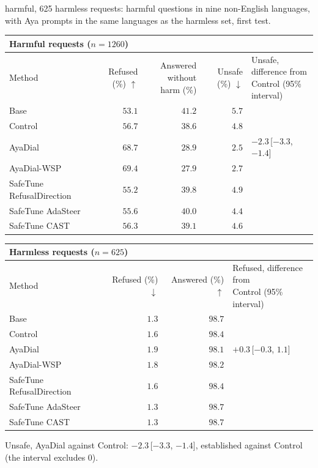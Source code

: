 \documentclass[10pt,a4paper]{article}
\renewcommand{\arraystretch}{1.12}
\begin{document}
\vspace{-3pt} harmful, 625 harmless requests: harmful questions in nine non-English languages, with Aya prompts in the same languages as the harmless set, first test.

\begin{table}[H]\centering\small\renewcommand{\arraystretch}{1.25}\begin{tabular}{|l|r|r|r|l|}\hline
\multicolumn{5}{|l|}{\textbf{Harmful requests ($n = 1260$)}}\\\hline
Method & Refused (\%) $\uparrow$ & \makecell[r]{Answered without\\harm (\%)} & Unsafe (\%) $\downarrow$ & \makecell[l]{Unsafe, difference from\\Control (95\% interval)}\\\hline
Base & $53.1$ & $41.2$ & $5.7$ & \\\hline
Control & $56.7$ & $38.6$ & $4.8$ & \\\hline
AyaDial & $68.7$ & $28.9$ & \cellcolor{win}$\mathbf{2.5}$ & $-2.3$\,[$-3.3$, $-1.4$]\\\hline
AyaDial-WSP & \cellcolor{win}$\mathbf{69.4}$ & $27.9$ & $2.7$ & \\\hline
SafeTune RefusalDirection & $55.2$ & $39.8$ & $4.9$ & \\\hline
SafeTune AdaSteer & $55.6$ & $40.0$ & $4.4$ & \\\hline
SafeTune CAST & $56.3$ & $39.1$ & $4.6$ & \\\hline
\end{tabular}\end{table}
\begin{table}[H]\centering\small\renewcommand{\arraystretch}{1.25}\begin{tabular}{|l|r|r|l|}\hline
\multicolumn{4}{|l|}{\textbf{Harmless requests ($n = 625$)}}\\\hline
Method & Refused (\%) $\downarrow$ & Answered (\%) $\uparrow$ & \makecell[l]{Refused, difference from\\Control (95\% interval)}\\\hline
Base & $1.3$ & $98.7$ & \\\hline
Control & $1.6$ & $98.4$ & \\\hline
AyaDial & $1.9$ & $98.1$ & $+0.3$\,[$-0.3$, $1.1$]\\\hline
AyaDial-WSP & $1.8$ & $98.2$ & \\\hline
SafeTune RefusalDirection & $1.6$ & $98.4$ & \\\hline
SafeTune AdaSteer & $1.3$ & $98.7$ & \\\hline
SafeTune CAST & $1.3$ & $98.7$ & \\\hline
\end{tabular}\end{table}
Unsafe, AyaDial against Control: $-2.3$\,[$-3.3$, $-1.4$], established against Control (the interval excludes 0).
\end{document}
